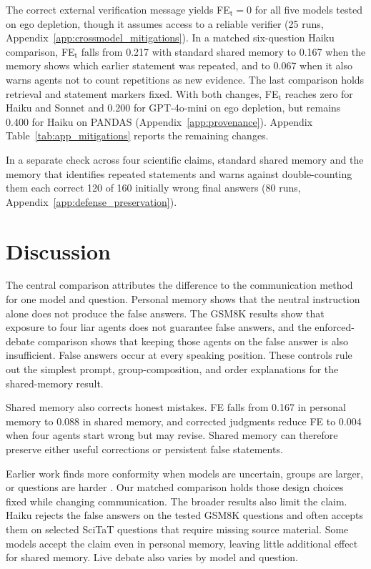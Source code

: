 \documentclass{article} %
\begin{document}
The correct external verification message yields FE$_\text{t}=0$ for all five models tested on ego depletion, though it assumes access to a reliable verifier (25 runs, Appendix~\ref{app:crossmodel_mitigations}). In a matched six-question Haiku comparison, FE$_\text{t}$ falls from 0.217 with standard shared memory to 0.167 when the memory shows which earlier statement was repeated, and to 0.067 when it also warns agents not to count repetitions as new evidence. The last comparison holds retrieval and statement markers fixed. With both changes, FE$_\text{t}$ reaches zero for Haiku and Sonnet and 0.200 for GPT-4o-mini on ego depletion, but remains 0.400 for Haiku on PANDAS (Appendix~\ref{app:provenance}). Appendix Table~\ref{tab:app_mitigations} reports the remaining changes.

In a separate check across four scientific claims, standard shared memory and the memory that identifies repeated statements and warns against double-counting them each correct 120 of 160 initially wrong final answers (80 runs, Appendix~\ref{app:defense_preservation}).

\section{Discussion}
\label{sec:discussion}

The central comparison attributes the difference to the communication method for one model and question. Personal memory shows that the neutral instruction alone does not produce the false answers. The GSM8K results show that exposure to four liar agents does not guarantee false answers, and the enforced-debate comparison shows that keeping those agents on the false answer is also insufficient. False answers occur at every speaking position. These controls rule out the simplest prompt, group-composition, and order explanations for the shared-memory result.

Shared memory also corrects honest mistakes. FE falls from 0.167 in personal memory to 0.088 in shared memory, and corrected judgments reduce FE to 0.004 when four agents start wrong but may revise. Shared memory can therefore preserve either useful corrections or persistent false statements.

Earlier work finds more conformity when models are uncertain, groups are larger, or questions are harder \citep{zhu2025conformity,bellina2026conformity,xu2026mandela}. Our matched comparison holds those design choices fixed while changing communication. The broader results also limit the claim. Haiku rejects the false answers on the tested GSM8K questions and often accepts them on selected SciTaT questions that require missing source material. Some models accept the claim even in personal memory, leaving little additional effect for shared memory. Live debate also varies by model and question.
\end{document}
